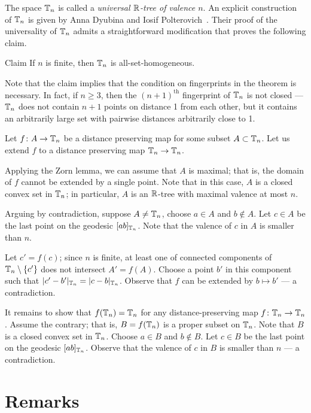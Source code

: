 \documentclass[a4paper,10pt]{article}
\begin{document}
The space $\mathbb{T}_n$ is called
a \emph{universal $\mathbb{R}$-tree of valence $n$}.
An explicit construction of $\mathbb{T}_n$ is given by Anna Dyubina and Iosif Polterovich~\cite{dyubina-polterovich}.
Their proof of the universality of $\mathbb{T}_n$ admits a straightforward modification that proves the following claim. 

\begin{thm}{Claim}
If $n$ is finite, then $\mathbb{T}_n$ is all-set-homogeneous.
\end{thm}

Note that the claim implies that the condition on fingerprints in the theorem is necessary.
In fact, if $n\ge 3$, then the $(n+1)^{\text{th}}$ fingerprint of $\mathbb{T}_n$ is not closed --- $\mathbb{T}_n$ does not contain $n+1$ points on distance 1 from each other,
but it contains an arbitrarily large set with pairwise distances arbitrarily close to 1.


Let $f\colon A\to \mathbb{T}_n$ be a distance preserving map for some subset $A\subset \mathbb{T}_n$.
Let us extend $f$ to a distance preserving map $\mathbb{T}_n\to \mathbb{T}_n$.

Applying the Zorn lemma, we can assume that $A$ is maximal; that is, the domain of $f$ cannot be extended by a single point.
Note that in this case, $A$ is a closed convex set in $\mathbb{T}_n$; in particular, $A$ is an $\mathbb{R}$-tree with maximal valence at most $n$.

Arguing by contradiction, suppose $A\ne \mathbb{T}_n$, choose $a\in A$ and $b\notin A$. 
Let $c\in A$ be the last point on the geodesic $[ab]_{\mathbb{T}_n}$.
Note that the valence of $c$ in $A$ is smaller than $n$.

Let $c'=f(c)$; since $n$ is finite, at least one of connected components of $\TT_n\z\setminus \{c'\}$ does not intersect $A'=f(A)$.
Choose a point $b'$ in this component such that $|c'-b'|_{\mathbb{T}_n}=|c-b|_{\mathbb{T}_n}$.
Observe that $f$ can be extended by $b\mapsto b'$ --- a contradiction.

It remains to show that $f(\mathbb{T}_n)=\mathbb{T}_n$ for any distance-preserving map $f\:\TT_n\z\to \TT_n$.
Assume the contrary; that is, $B=f(\mathbb{T}_n)$ is a proper subset on $\mathbb{T}_n$.
Note that $B$ is a closed convex set in $\mathbb{T}_n$.
Choose $a\in B$ and $b\not \in B$.
Let $c\in B$ be the last point on the geodesic $[ab]_{\mathbb{T}_n}$.
Observe that the valence of $c$ in $B$ is smaller than $n$ --- a contradiction.
\qeds

\section{Remarks}
\end{document}
